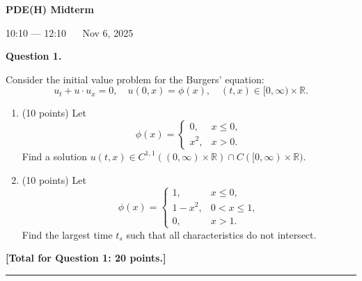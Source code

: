 \documentclass[11pt, a4paper]{article}
\begin{document}
\begin{center}
    \huge \textbf{PDE(H) Midterm}
    \vspace{0.5cm}

    \large 10:10 --- 12:10 $\quad$ Nov 6, 2025
\end{center}

\vspace{0.5cm}

\textbf{Question 1.}

Consider the initial value problem for the Burgers' equation:
\[
    u_t + u \cdot u_x = 0, \quad u(0, x) = \phi(x), \quad (t, x) \in [0, \infty) \times \mathbb{R}.
\]

\begin{enumerate}[label=(\alph*)]
    \item (10 points) Let
          \[
              \phi(x) = \begin{cases}
                  0,   & x \le 0, \\
                  x^2, & x > 0.
              \end{cases}
          \]
          Find a solution $u(t, x) \in C^{1,1}((0, \infty) \times \mathbb{R}) \cap C([0, \infty) \times \mathbb{R})$.

    \item (10 points) Let
          \[
              \phi(x) = \begin{cases}
                  1,       & x \le 0,     \\
                  1 - x^2, & 0 < x \le 1, \\
                  0,       & x > 1.
              \end{cases}
          \]
          Find the largest time $t_s$ such that all characteristics do not intersect.
\end{enumerate}
\textbf{[Total for Question 1: 20 points.]}

\noindent \rule[0.5pt]{\textwidth}{0.5pt}
\end{document}

